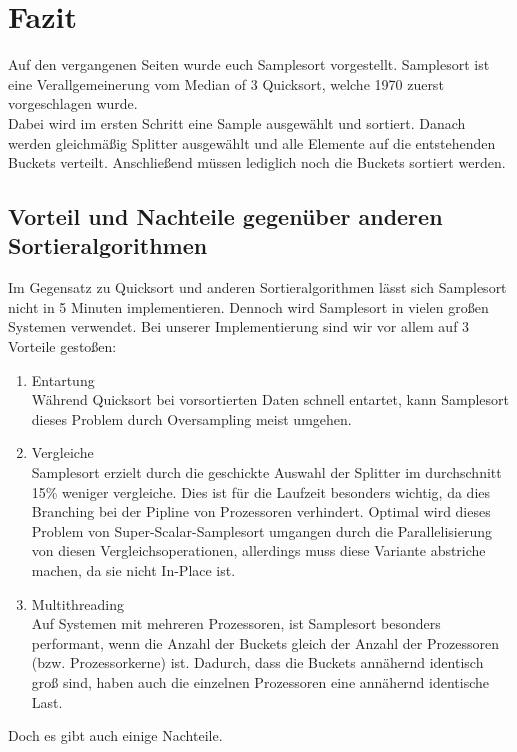 \section{Fazit}
	Auf den vergangenen Seiten wurde euch Samplesort vorgestellt.
	Samplesort ist eine Verallgemeinerung vom Median of 3 Quicksort, welche 1970 zuerst vorgeschlagen wurde.\\
	Dabei wird im ersten Schritt eine Sample ausgewählt und sortiert.
	Danach werden gleichmäßig Splitter ausgewählt und alle Elemente auf die entstehenden Buckets verteilt.
	Anschließend müssen lediglich noch die Buckets sortiert werden.
	
	\subsection{Vorteil und Nachteile gegenüber anderen Sortieralgorithmen}
		Im Gegensatz zu Quicksort und anderen Sortieralgorithmen lässt sich Samplesort nicht in 5 Minuten implementieren.
		Dennoch wird Samplesort in vielen großen Systemen verwendet.
		Bei unserer Implementierung sind wir vor allem auf 3 Vorteile gestoßen:
		\begin{enumerate}
			\item Entartung\\
				Während Quicksort bei vorsortierten Daten schnell entartet, kann Samplesort dieses Problem durch Oversampling meist umgehen.
			\item Vergleiche\\
				Samplesort erzielt durch die geschickte Auswahl der Splitter im durchschnitt 15\% weniger vergleiche.
				Dies ist für die Laufzeit besonders wichtig, da dies Branching bei der Pipline von Prozessoren verhindert.
				Optimal wird dieses Problem von Super-Scalar-Samplesort umgangen durch die Parallelisierung von diesen Vergleichsoperationen, allerdings muss diese Variante abstriche machen, da sie nicht In-Place ist.
			\item Multithreading\\
				Auf Systemen mit mehreren Prozessoren, ist Samplesort besonders performant, wenn die Anzahl der Buckets gleich der Anzahl der Prozessoren (bzw. Prozessorkerne) ist.
				Dadurch, dass die Buckets annähernd identisch groß sind, haben auch die einzelnen Prozessoren eine annähernd identische Last.
		\end{enumerate}
		Doch es gibt auch einige Nachteile.
